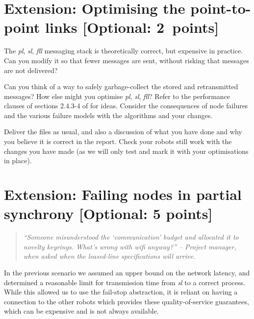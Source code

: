 \documentclass[a4paper]{article}
\begin{document}






\section*{Extension: Optimising the point-to-point links [Optional: 2~points]} %
\label{sec:extension_optimising_the_link_channels}

The \emph{pl}, \emph{sl}, \emph{fll} messaging stack is theoretically correct,
but expensive in practice. Can you modify it so that fewer messages are sent,
without risking that messages are not delivered?

Can you think of a way to safely garbage-collect the stored and retransmitted
messages? How else might you optimise \emph{pl}, \emph{sl}, \emph{fll}? Refer to the
performance clauses of sections 2.4.3-4 of \cite{cachin2011} for ideas.
Consider the consequences of node failures and the various failure models
with the algorithms and your changes.

Deliver the files as usual, and also a discussion of what you have done and
why you believe it is correct in the report. Check your robots still work
with the changes you have made (as we will only test and mark it with your
optimisations in place).







\section*{Extension: Failing nodes in partial synchrony [Optional: 5 points]} %
\label{sec:problem_3_partial_synchrony}

\begin{quote}
  \emph{``Someone misunderstood the `communication' budget and allocated it to novelty keyrings.
  What's wrong with wifi anyway?'' -- Project manager, when asked when the leased-line specifications will arrive.
  }
\end{quote}


In the previous scenario we assumed an upper bound on the network latency, and
determined a reasonable limit for transmission time from \emph{sl} to a
correct process. While this allowed us to use the fail-stop abstraction, it is
reliant on having a connection to the other robots which provides these
quality-of-service guarantees, which can be expensive and is not always
available.
\end{document}

